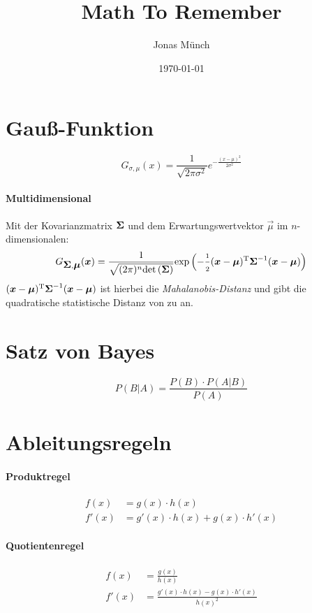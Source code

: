 \documentclass[a4paper]{scrartcl}
\begin{document}
\title{Math To Remember}
\author{Jonas Münch}
\date{\today}

\maketitle

\tableofcontents


\section{Gauß-Funktion}
\[
  G_{\sigma, \mu} (x) = \frac{1}{\sqrt{2 \pi \sigma^2}}e^{-\frac{(x - \mu)^2}{2 \sigma^2}}
\]

\paragraph{Multidimensional}
Mit der Kovarianzmatrix $\mbox{\boldmath$\Sigma$}$ und dem Erwartungswertvektor $\vec{\mu}$ im $n$-dimensionalen:
\[
  G_{\mbox{\boldmath$\Sigma$}, \mbox{\boldmath$\mu$}} (\mbox{\boldmath$x$}) = 
  \frac{1}{\sqrt{(2 \pi)^n {\mathord{\det\left( \mbox{\boldmath$\Sigma$} \right)}}}}{\mathord{\rm {exp}}}\left( -\frac{\scriptstyle 1}{\scriptstyle 2} {(\mbox{\boldmath$x$}-\mbox{\boldmath$\mu$})}\textsuperscript{T} \mbox{\boldmath$\Sigma$}^{-1} (\mbox{\boldmath$x$}-\mbox{\boldmath$\mu$})\right)
\]
${(\mbox{\boldmath$x$}-\mbox{\boldmath$\mu$})}\textsuperscript{T} \mbox{\boldmath$\Sigma$}^{-1} (\mbox{\boldmath$x$}-\mbox{\boldmath$\mu$})$ ist hierbei die \emph{Mahalanobis-Distanz} und gibt die quadratische statistische Distanz von  zu \vec{\mu} an.

\section{Satz von Bayes}

\[
  P(B|A) = \frac{P(B) \cdot P(A|B)}{P(A)}
\]

\section{Ableitungsregeln}

\paragraph{Produktregel}
\begin{align*}
    f(x) &= g(x) \cdot h(x) \\
    f'(x) &= g'(x) \cdot h(x) + g(x) \cdot h'(x)
\end{align*}

\paragraph{Quotientenregel}
\begin{align*}
    f(x) &= \frac{g(x)}{h(x)} \\
    f'(x) &= \frac{g'(x) \cdot h(x) - g(x) \cdot h'(x)}{h(x)^2}
\end{align*}
\end{document}
